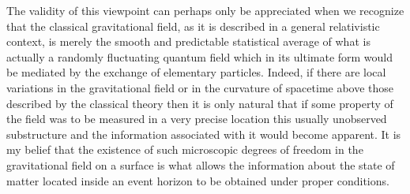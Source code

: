 \documentclass[notitlepage,12pt]{report}
\begin{document}
The validity of this viewpoint can perhaps only be appreciated when we recognize that the classical gravitational field, as it is described in a general relativistic context, is merely the smooth and predictable statistical average of what is actually a randomly fluctuating quantum field which in its ultimate form would be mediated by the exchange of elementary particles. Indeed, if there are local variations in the gravitational field or in the curvature of spacetime above those described by the classical theory then it is only natural that if some property of the field was to be measured in a very precise location this usually unobserved substructure and the information associated with it would become apparent. It is my belief that the existence of such microscopic degrees of freedom in the gravitational field on a surface is what allows the information about the state of matter located inside an event horizon to be obtained under proper conditions.
\end{document}

